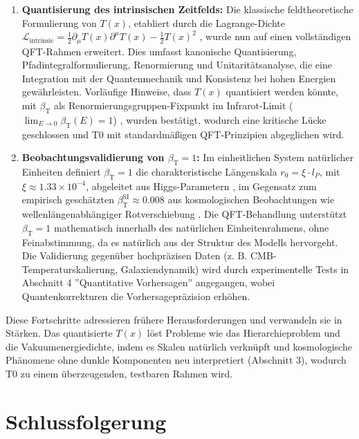 \documentclass[12pt,a4paper]{article}
\newcommand{\Tfield}{T(x)}
\newcommand{\betaT}{\beta_{\text{T}}}
\newcommand{\calL}{\mathcal{L}}
\begin{document}
	\begin{enumerate}
		\item \textbf{Quantisierung des intrinsischen Zeitfelds:} Die klassische feldtheoretische Formulierung von \(\Tfield\), etabliert durch die Lagrange-Dichte \(\calL_{\text{intrinsic}} = \frac{1}{2}\partial_{\mu}\Tfield\partial^{\mu}\Tfield - \frac{1}{2}\Tfield^2\) \cite{pascher_lagrange_2025}, wurde nun auf einen vollständigen QFT-Rahmen erweitert. Dies umfasst kanonische Quantisierung, Pfadintegralformulierung, Renormierung und Unitaritätsanalyse, die eine Integration mit der Quantenmechanik und Konsistenz bei hohen Energien gewährleisten. Vorläufige Hinweise, dass \(\Tfield\) quantisiert werden könnte, mit \(\betaT\) als Renormierungsgruppen-Fixpunkt im Infrarot-Limit (\(\lim_{E \to 0} \betaT(E) = 1\)) \cite{pascher_alphabeta_2025}, wurden bestätigt, wodurch eine kritische Lücke geschlossen und T0 mit standardmäßigen QFT-Prinzipien abgeglichen wird.
		
		\item \textbf{Beobachtungsvalidierung von \(\betaT = 1\):} Im einheitlichen System natürlicher Einheiten definiert \(\betaT = 1\) die charakteristische Längenskala \(r_0 = \xi \cdot l_P\), mit \(\xi \approx 1.33 \times 10^{-4}\), abgeleitet aus Higgs-Parametern \cite{pascher_params_2025, pascher_alphabeta_2025}, im Gegensatz zum empirisch geschätzten \(\betaT^{\text{SI}} \approx 0.008\) aus kosmologischen Beobachtungen wie wellenlängenabhängiger Rotverschiebung \cite{pascher_messdifferenzen_2025}. Die QFT-Behandlung unterstützt \(\betaT = 1\) mathematisch innerhalb des natürlichen Einheitenrahmens, ohne Feinabstimmung, da es natürlich aus der Struktur des Modells hervorgeht. Die Validierung gegenüber hochpräzisen Daten (z. B. CMB-Temperaturskalierung, Galaxiendynamik) wird durch experimentelle Tests in Abschnitt 4 ''Quantitative Vorhersagen'' angegangen, wobei Quantenkorrekturen die Vorhersagepräzision erhöhen.
	\end{enumerate}
	
	Diese Fortschritte adressieren frühere Herausforderungen und verwandeln sie in Stärken. Das quantisierte \(\Tfield\) löst Probleme wie das Hierarchieproblem und die Vakuumenergiedichte, indem es Skalen natürlich verknüpft und kosmologische Phänomene ohne dunkle Komponenten neu interpretiert (Abschnitt 3), wodurch T0 zu einem überzeugenden, testbaren Rahmen wird.
	
	\section{Schlussfolgerung}
	\label{sec:conclusion}
	
\end{document}
